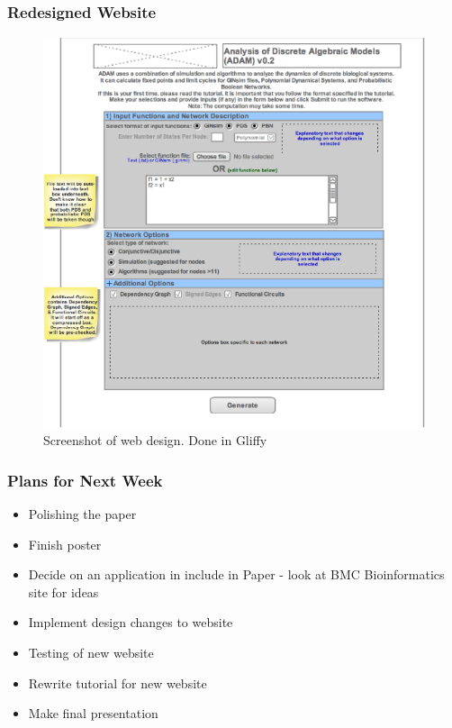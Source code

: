 \documentclass{beamer}
\begin{document}
\begin{frame}
	\frametitle{Redesigned Website}
	\begin{figure}[h]
	\centering
	\includegraphics[scale=0.60]{websiteDesign.png}
	\caption{Screenshot of web design. Done in Gliffy}
\end{figure}
\end{frame}

\begin{frame}
	\frametitle{Plans for Next Week}
	\begin{itemize}
		\item{Polishing the paper}
		\item{Finish poster}
		\item{Decide on an application in include in Paper - look at BMC Bioinformatics site for ideas}
		\item{Implement design changes to website}
		\item{Testing of new website}
		\item{Rewrite tutorial for new website}
		\item{Make final presentation}
	\end{itemize}
\end{frame}
\end{document}
